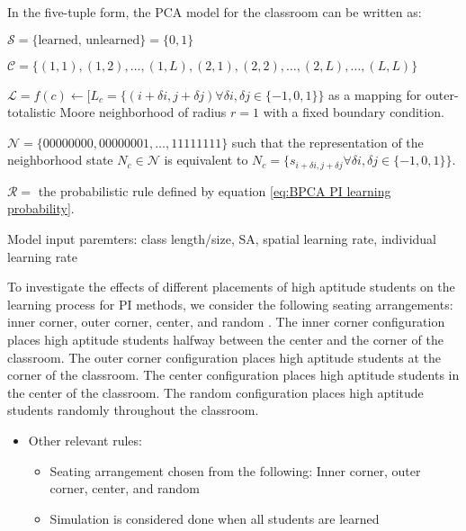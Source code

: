 In the five-tuple form, the PCA model for the classroom can be written as:

$\mathcal{S} = \lbrace \text{learned, unlearned} \rbrace = \lbrace 0, 1 \rbrace$

$\mathcal{C} = \lbrace (1,1), (1,2), \dots, (1,L), (2, 1), (2,2), \dots, (2,L), \dots, (L,L)\rbrace$

$\mathcal{L} = f(c) \leftarrow \lbrack L_c = \lbrace (i+\delta i,j+\delta j) \forall \delta i, \delta j \in \lbrace -1,0,1 \rbrace \rbrace $ as a mapping for outer-totalistic Moore neighborhood of radius $r=1$ with a fixed boundary condition.

$\mathcal{N} = \lbrace 00000000, 00000001, \dots, 11111111 \rbrace$ such that the representation of the neighborhood state $N_c \in \mathcal{N}$ is equivalent to $N_c = \lbrace s_{i+\delta i, j+\delta j} \forall \delta i, \delta j \in \lbrace -1,0,1 \rbrace \rbrace$.

$\mathcal{R} =$ the probabilistic rule defined by equation \ref{eq:BPCA PI learning probability}.

Model input paremters: class length/size, SA, spatial learning rate, individual learning rate

To investigate the effects of different placements of high aptitude students on the learning process for PI methods, we consider the following seating arrangements: inner corner, outer corner, center, and random \cite{roxas2010seating}. The inner corner configuration places high aptitude students halfway between the center and the corner of the classroom. The outer corner configuration places high aptitude students at the corner of the classroom. The center configuration places high aptitude students in the center of the classroom. The random configuration places high aptitude students randomly throughout the classroom.

\begin{itemize}
    \item Other relevant rules:
    \begin{itemize}
        \item Seating arrangement chosen from the following: Inner corner, outer corner, center, and random \cite{roxas2010seating}
        \item Simulation is considered done when all students are learned
    \end{itemize}
   
\end{itemize}

